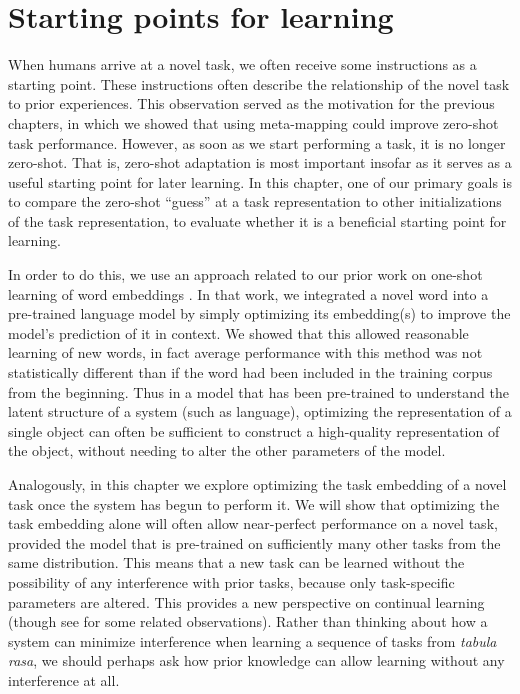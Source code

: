 \section{Starting points for learning}

When humans arrive at a novel task, we often receive some instructions as a starting point. These instructions often describe the relationship of the novel task to prior experiences. This observation served as the motivation for the previous chapters, in which we showed that using meta-mapping could improve zero-shot task performance. However, as soon as we start performing a task, it is no longer zero-shot. That is, zero-shot adaptation is most important insofar as it serves as a useful starting point for later learning. In this chapter, one of our primary goals is to compare the zero-shot ``guess'' at a task representation to other initializations of the task representation, to evaluate whether it is a beneficial starting point for learning. \par 
In order to do this, we use an approach related to our prior work on one-shot learning of word embeddings \citep{Lampinen2018a}. In that work, we integrated a novel word into a pre-trained language model by simply optimizing its embedding(s) to improve the model's prediction of it in context. We showed that this allowed reasonable learning of new words, in fact average performance with this method was not statistically different than if the word had been included in the training corpus from the beginning. Thus in a model that has been pre-trained to understand the latent structure of a system (such as language), optimizing the representation of a single object can often be sufficient to construct a high-quality representation of the object, without needing to alter the other parameters of the model. \par
Analogously, in this chapter we explore optimizing the task embedding of a novel task once the system has begun to perform it. We will show that optimizing the task embedding alone will often allow near-perfect performance on a novel task, provided the model that is pre-trained on sufficiently many other tasks from the same distribution. This means that a new task can be learned without the possibility of any interference with prior tasks, because only task-specific parameters are altered. This provides a new perspective on continual learning (though see \citep{Oswald2020} for some related observations). Rather than thinking about how a system can minimize interference when learning a sequence of tasks from \emph{tabula rasa}, we should perhaps ask how prior knowledge can allow learning without any interference at all. \par 
